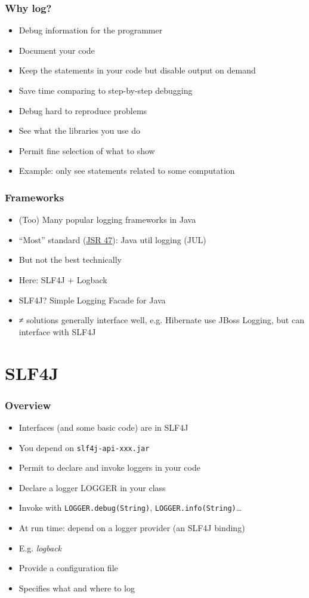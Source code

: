 \documentclass[french, english]{beamer}
\begin{document}
\begin{frame}
	\frametitle{Why log?}
	\begin{itemize}	
		\item Debug information for the programmer
		\item Document your code
		\item Keep the statements in your code but disable output on demand
		\item Save time comparing to step-by-step debugging
		\item Debug hard to reproduce problems
		\item See what the libraries you use do
		\item Permit fine selection of what to show
		\item Example: only see statements related to some computation
	\end{itemize}
\end{frame}

\begin{frame}
	\frametitle{Frameworks}
	\begin{itemize}
		\item (Too) Many popular logging frameworks in Java
		\item “Most” standard (\href{https://jcp.org/en/jsr/detail?id=47}{JSR 47}): Java util logging (JUL)
		\item But not the best technically
		\item Here: SLF4J + Logback
		\item SLF4J? \pause Simple Logging Facade for Java
		\item ≠ solutions generally interface well, e.g. Hibernate use JBoss Logging, but can interface with SLF4J
	\end{itemize}
\end{frame}

\section{SLF4J}
\begin{frame}
	\frametitle{Overview}
	\begin{itemize}
		\item Interfaces (and some basic code) are in SLF4J
		\item You depend on \texttt{slf4j-api-xxx.jar}
		\item Permit to declare and invoke loggers in your code
		\item Declare a logger LOGGER in your class
		\item Invoke with \texttt{LOGGER.debug(String)}, \texttt{LOGGER.info(String)}…
		\item At run time: depend on a logger provider (an SLF4J binding)
		\item E.g. \emph{logback}
		\item Provide a configuration file
		\item Specifies what and where to log
	\end{itemize}
\end{frame}
\end{document}
